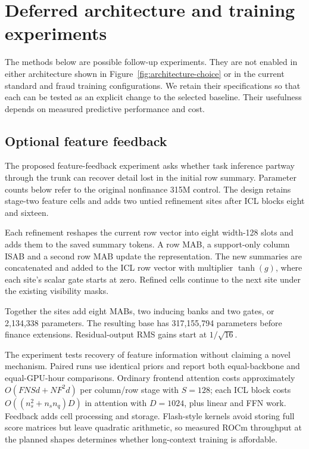 \documentclass[11pt]{article}
\begin{document}
\section{Deferred architecture and training experiments}
\label{app:deferred-methods}

The methods below are possible follow-up experiments. They are not enabled in either architecture shown in Figure~\ref{fig:architecture-choice} or in the current standard and fraud training configurations. We retain their specifications so that each can be tested as an explicit change to the selected baseline. Their usefulness depends on measured predictive performance and cost.

\subsection{Optional feature feedback}
\label{sec:feature-feedback}

The proposed feature-feedback experiment asks whether task inference partway through the trunk can recover detail lost in the initial row summary. Parameter counts below refer to the original nonfinance 315M control. The design retains stage-two feature cells and adds two untied refinement sites after ICL blocks eight and sixteen.

Each refinement reshapes the current row vector into eight width-128 slots and adds them to the saved summary tokens. A row MAB, a support-only column ISAB and a second row MAB update the representation. The new summaries are concatenated and added to the ICL row vector with multiplier $\tanh(g)$, where each site's scalar gate starts at zero. Refined cells continue to the next site under the existing visibility masks.

Together the sites add eight MABs, two inducing banks and two gates, or 2,134,338 parameters. The resulting base has 317,155,794 parameters before finance extensions. Residual-output RMS gains start at $1/\sqrt{16}$.

The experiment tests recovery of feature information without claiming a novel mechanism. Paired runs use identical priors and report both equal-backbone and equal-GPU-hour comparisons. Ordinary frontend attention costs approximately $O(FNSd+NF^2d)$ per column/row stage with $S=128$; each ICL block costs $O((n_s^2+n_sn_q)D)$ in attention with $D=1024$, plus linear and FFN work. Feedback adds cell processing and storage. Flash-style kernels avoid storing full score matrices but leave quadratic arithmetic, so measured ROCm throughput at the planned shapes determines whether long-context training is affordable.
\end{document}
